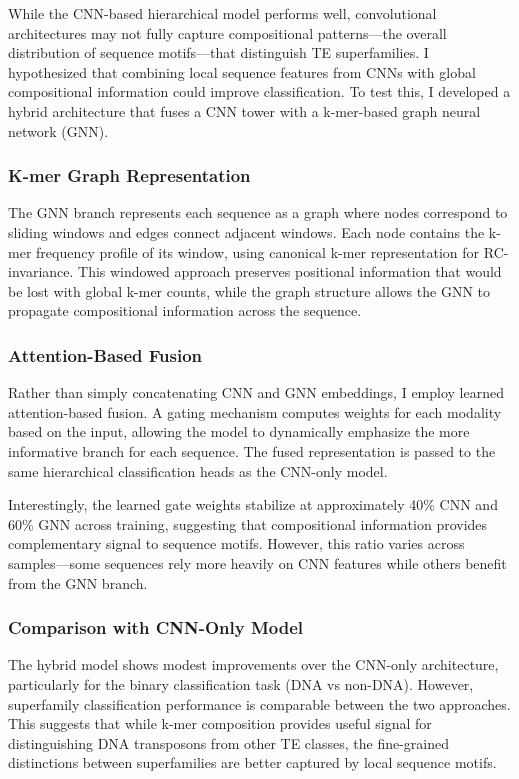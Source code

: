 \documentclass[12pt]{article}
\begin{document}
While the CNN-based hierarchical model performs well, convolutional architectures may not fully capture compositional patterns—the overall distribution of sequence motifs—that distinguish TE superfamilies. I hypothesized that combining local sequence features from CNNs with global compositional information could improve classification. To test this, I developed a hybrid architecture that fuses a CNN tower with a k-mer-based graph neural network (GNN).

\subsubsection{K-mer Graph Representation}

The GNN branch represents each sequence as a graph where nodes correspond to sliding windows and edges connect adjacent windows. Each node contains the k-mer frequency profile of its window, using canonical k-mer representation for RC-invariance. This windowed approach preserves positional information that would be lost with global k-mer counts, while the graph structure allows the GNN to propagate compositional information across the sequence.

\subsubsection{Attention-Based Fusion}

Rather than simply concatenating CNN and GNN embeddings, I employ learned attention-based fusion. A gating mechanism computes weights for each modality based on the input, allowing the model to dynamically emphasize the more informative branch for each sequence. The fused representation is passed to the same hierarchical classification heads as the CNN-only model.

Interestingly, the learned gate weights stabilize at approximately 40\% CNN and 60\% GNN across training, suggesting that compositional information provides complementary signal to sequence motifs. However, this ratio varies across samples—some sequences rely more heavily on CNN features while others benefit from the GNN branch.

\subsubsection{Comparison with CNN-Only Model}

The hybrid model shows modest improvements over the CNN-only architecture, particularly for the binary classification task (DNA vs non-DNA). However, superfamily classification performance is comparable between the two approaches. This suggests that while k-mer composition provides useful signal for distinguishing DNA transposons from other TE classes, the fine-grained distinctions between superfamilies are better captured by local sequence motifs.
\end{document}
